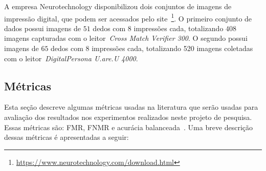 A empresa Neurotechnology disponibilizou dois conjuntos de imagens de impressão digital, que podem ser acessados pelo site~\footnote{\url{https://www.neurotechnology.com/download.html}}. O primeiro conjunto de dados possui imagens de $51$ dedos com $8$ impressões cada, totalizando $408$ imagens capturadas com o leitor~\textit{Cross Match Verifier 300}. O segundo possui imagens de $65$ dedos com 8 impressões cada, totalizando 520 imagens coletadas com o leitor~\textit{DigitalPersona U.are.U 4000}.


\subsection{Métricas}\label{subsec:metricas}

Esta seção descreve algumas métricas usadas na literatura que serão usadas para avaliação dos resultados nos experimentos realizados neste projeto de pesquisa. Essas métricas são: FMR, FNMR e acurácia balanceada~\cite{Precise2014, Ferlini2021eargate}. Uma breve descrição dessas métricas é apresentadas a seguir:

